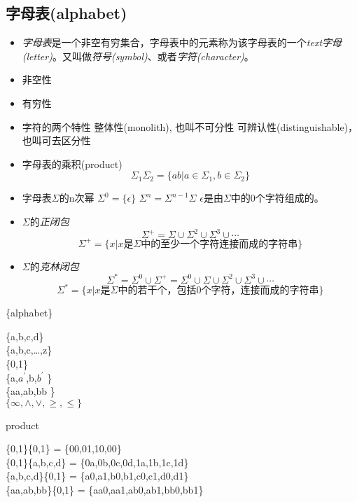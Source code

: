 \subsection{字母表(alphabet)}
\begin{itemize}
	\item \emph{字母表}是一个非空有穷集合，字母表中的元素称为该字母表的一个\emph{text字母(letter)}。又叫做\emph{符号(symbol)}、或者\emph{字符(character)}。
	\item 非空性
	\item 有穷性
	\item 字符的两个特性
		\subitem{-} 整体性(monolith), 也叫不可分性
		\subitem{-} 可辨认性(distinguishable)，也叫可去区分性
	\item 字母表的乘积(product)
	\[\Sigma_1\Sigma_2 = \{ab|a\in \Sigma_1,b\in \Sigma_2 \} \]
	\item 字母表$\Sigma$的n次幂
		\subitem $\Sigma^0 = \{\epsilon\}$
		\subitem $\Sigma^n = \Sigma^{n-1}\Sigma$
		\subitem $\epsilon$是由$\Sigma$中的0个字符组成的。
	\item $\Sigma$的\emph{正闭包}
		\[\Sigma^{+} = \Sigma \cup \Sigma^2 \cup \Sigma^3 \cup \cdots \]
		\[\Sigma^+ = \{x|x\text{是}\Sigma\text{中的至少一个字符连接而成的字符串}\} \]
	\item $\Sigma$的\emph{克林闭包}
		\[\Sigma^{\ast} = \Sigma^0 \cup \Sigma^+ = \Sigma^0 \cup \Sigma \cup \Sigma^2 \cup \Sigma^3 \cup \cdots \]
		\[\Sigma^{\ast} = \{x|x\text{是}\Sigma\text{中的若干个，包括0个字符，连接而成的字符串}\} \]
\end{itemize}

\begin{example} \{alphabet\}
	\begin{flushleft}
		\{a,b,c,d\}\\
		\{a,b,c,\dots,z\}\\
		\{0,1\} \\
		\{a,$a^{\prime}$,b,$b^{\prime}$ \}\\
		\{aa,ab,bb \}\\
		$\{\infty,\land,\lor,\geq,\leq \}$
	\end{flushleft}
\end{example}

\begin{example} product
	\begin{flushleft}
		\{0,1\}\{0,1\} = \{00,01,10,00\}\\
		\{0,1\}\{a,b,c,d\} = \{0a,0b,0c,0d,1a,1b,1c,1d\}\\
		\{a,b,c,d\}\{0,1\} = \{a0,a1,b0,b1,c0,c1,d0,d1\}\\
		\{aa,ab,bb\}\{0,1\} = \{aa0,aa1,ab0,ab1,bb0,bb1\}
	\end{flushleft}
\end{example}

